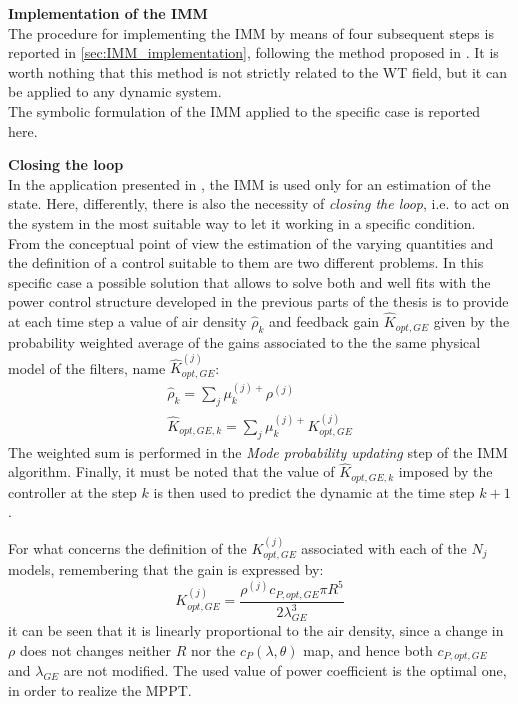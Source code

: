 \textbf{Implementation of the IMM}\\
The procedure for implementing the IMM by means of four subsequent steps is reported in \autoref{sec:IMM_implementation}, following the method proposed in \cite{kalman_based_IMM}. It is worth nothing that this method is not strictly related to the WT field, but it can be applied to any dynamic system.\\
The symbolic formulation of the IMM applied to the specific case is reported here.


\textbf{Closing the loop}\\
In the application presented in \cite{kalman_based_IMM}, the IMM is used only for an estimation of the state. Here, differently, there is also the necessity of \textit{closing the loop}, i.e. to act on the system in the most suitable way to let it working in a specific condition. From the conceptual point of view the estimation of the varying quantities and the definition of a control suitable to them are two different problems. In this specific case a possible solution that allows to solve both and well fits with the power control structure developed in the previous parts of the thesis is to provide at each time step a value of air density $\hat{\rho}_{k}$ and feedback gain $\hat{K}_{opt,GE}$ given by the probability weighted average of the gains associated to the the same physical model of the filters, name $\hat{K}_{opt,GE}^{(j)}$:
\begin{gather}
  \hat{\rho}_{k} = \sum_j \mu_k^{(j)+} \rho^{(j)}\\
  \hat{K}_{opt,GE,k} = \sum_j \mu_k^{(j)+} K_{opt,GE}^{(j)}
\end{gather}
The weighted sum is performed in the \textit{Mode probability updating} step of the IMM algorithm. Finally, it must be noted that the value of $\hat{K}_{opt,GE,k}$ imposed by the controller at the step $k$ is then used to predict the dynamic at the time step $k+1$.

For what concerns the definition of the $K_{opt, GE}^{(j)}$ associated with each of the $N_j$ models, remembering that the gain is expressed by:
\begin{equation}
  K_{opt,GE}^{(j)} = \frac{\rho^{(j)} c_{P,opt,GE}\pi R^5}{2\lambda_{GE}^3}
\end{equation}
it can be seen that it is linearly proportional to the air density, since a change in $\rho$ does not changes neither $R$ nor the $c_P(\lambda,\theta)$ map, and hence both $c_{P,opt,GE}$ and $\lambda_{GE}$ are not modified. The used value of power coefficient is the optimal one, in order to realize the MPPT. 

